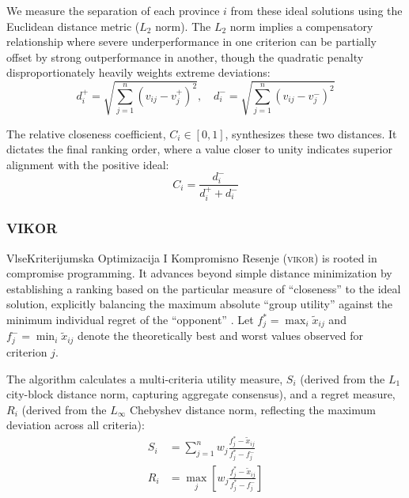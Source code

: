 \documentclass[12pt,a4paper]{article}
\newcommand{\VIKOR}{\textsc{vikor}\xspace}
\begin{document}
We measure the separation of each province \( i \) from these ideal solutions using the Euclidean distance metric (\( L_2 \) norm). The \( L_2 \) norm implies a compensatory relationship where severe underperformance in one criterion can be partially offset by strong outperformance in another, though the quadratic penalty disproportionately heavily weights extreme deviations:
\begin{equation}
    d_i^+ = \sqrt{ \sum_{j=1}^{n} (v_{ij} - v_j^+)^2 }, \quad d_i^- = \sqrt{ \sum_{j=1}^{n} (v_{ij} - v_j^-)^2 }
\end{equation}

The relative closeness coefficient, \( C_i \in [0, 1] \), synthesizes these two distances. It dictates the final ranking order, where a value closer to unity indicates superior alignment with the positive ideal:
\begin{equation}
    C_i = \frac{d_i^-}{d_i^+ + d_i^-}
\end{equation}

\subsubsection{VIKOR}
\label{subsubsec:vikor}
VlseKriterijumska Optimizacija I Kompromisno Resenje (\VIKOR) is rooted in compromise programming. It advances beyond simple distance minimization by establishing a ranking based on the particular measure of ``closeness'' to the ideal solution, explicitly balancing the maximum absolute ``group utility'' against the minimum individual regret of the ``opponent'' \citep{Opricovic2004}. Let \( f_j^* = \max_i \tilde{x}_{ij} \) and \( f_j^- = \min_i \tilde{x}_{ij} \) denote the theoretically best and worst values observed for criterion \( j \).

The algorithm calculates a multi-criteria utility measure, \( S_i \) (derived from the \( L_1 \) city-block distance norm, capturing aggregate consensus), and a regret measure, \( R_i \) (derived from the \( L_\infty \) Chebyshev distance norm, reflecting the maximum deviation across all criteria):
\begin{align}
    S_i &= \sum_{j=1}^{n} w_j \frac{f_j^* - \tilde{x}_{ij}}{f_j^* - f_j^-} \\
    R_i &= \max_j \left[ w_j \frac{f_j^* - \tilde{x}_{ij}}{f_j^* - f_j^-} \right]
\end{align}
\end{document}
